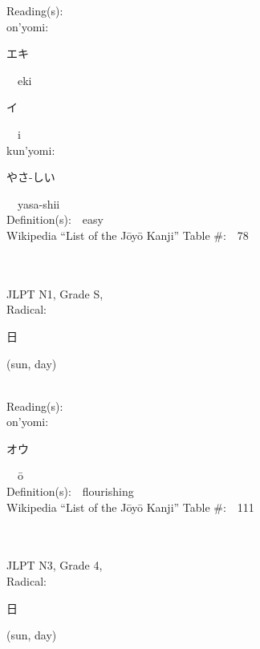 \begin{multicols}{2}
Reading(s):\ \ \\
{\hspace*{1em}}on'yomi:\ \ \\
{\hspace*{2em}}{\begin{CJK}{UTF8}{min} エキ \end{CJK}}\ \ eki\ \ \\
{\hspace*{2em}}{\begin{CJK}{UTF8}{min} イ \end{CJK}}\ \ i\ \ \\
{\hspace*{1em}}kun'yomi:\ \ \\
{\hspace*{2em}}{\begin{CJK}{UTF8}{min} やさ-しい \end{CJK}}\ \ yasa-shii\ \ \\
Definition(s):\ \ easy \\
Wikipedia ``List of the J\=oy\=o Kanji'' Table \#:\ \ 78 \\
\ \ \\
{\fontsize{34pt}{40pt}  }\ \ \\
{JLPT N1, Grade S, \\Radical:\ \ {\begin{CJK}{UTF8}{min} 日 \end{CJK}} (sun, day) } \\
Reading(s):\ \ \\
{\hspace*{1em}}on'yomi:\ \ \\
{\hspace*{2em}}{\begin{CJK}{UTF8}{min} オウ \end{CJK}}\ \ \=o\ \ \\
Definition(s):\ \ flourishing \\
Wikipedia ``List of the J\=oy\=o Kanji'' Table \#:\ \ 111 \\
\ \ \\
{\fontsize{34pt}{40pt}  }\ \ \\  %
{JLPT N3, Grade 4, \\Radical:\ \ {\begin{CJK}{UTF8}{min} 日 \end{CJK}} (sun, day) } \\

\end{multicols}
